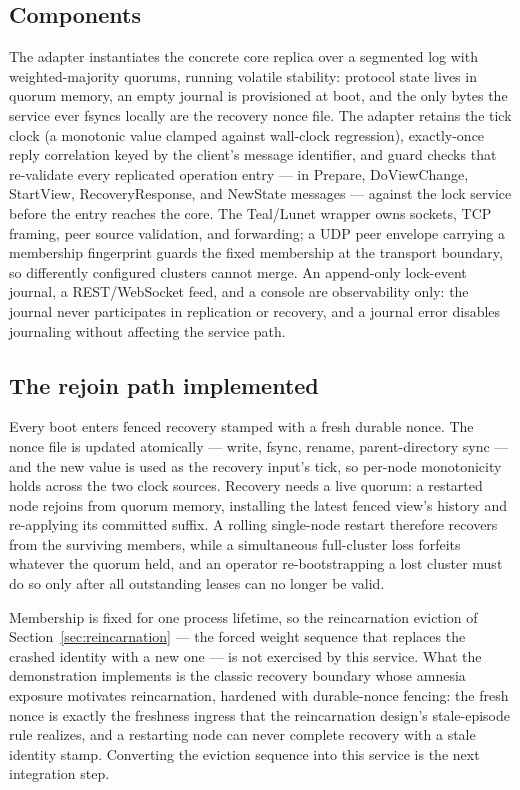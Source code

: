 \documentclass[10pt,journal,letterpaper]{IEEEtran}
\begin{document}
\subsection{Components}
The adapter instantiates the concrete core replica over a segmented log with
weighted-majority quorums, running volatile stability: protocol state lives
in quorum memory, an empty journal is provisioned at boot, and the only bytes
the service ever fsyncs locally are the recovery nonce file. The adapter
retains the tick clock (a monotonic value clamped against wall-clock
regression), exactly-once reply correlation keyed by the client's message
identifier, and guard checks that re-validate every replicated operation
entry --- in Prepare, DoViewChange, StartView, RecoveryResponse, and NewState
messages --- against the lock service before the entry reaches the core. The
Teal/Lunet wrapper owns sockets, TCP framing, peer source validation, and
forwarding; a UDP peer envelope carrying a membership fingerprint guards the
fixed membership at the transport boundary, so differently configured
clusters cannot merge. An append-only lock-event journal, a REST/WebSocket
feed, and a console are observability only: the journal never participates in
replication or recovery, and a journal error disables journaling without
affecting the service path.

\subsection{The rejoin path implemented}
Every boot enters fenced recovery stamped with a fresh durable nonce. The
nonce file is updated atomically --- write, fsync, rename, parent-directory
sync --- and the new value is used as the recovery input's tick, so
per-node monotonicity holds across the two clock sources. Recovery needs a
live quorum: a restarted node rejoins from quorum memory, installing the
latest fenced view's history and re-applying its committed suffix. A rolling
single-node restart therefore recovers from the surviving members, while a
simultaneous full-cluster loss forfeits whatever the quorum held, and an
operator re-bootstrapping a lost cluster must do so only after all
outstanding leases can no longer be valid.

Membership is fixed for one process lifetime, so the reincarnation eviction
of Section~\ref{sec:reincarnation} --- the forced weight sequence that
replaces the crashed identity with a new one --- is not exercised by this
service. What the demonstration implements is the classic recovery boundary
whose amnesia exposure motivates reincarnation, hardened with durable-nonce
fencing: the fresh nonce is exactly the freshness ingress that the
reincarnation design's stale-episode rule realizes, and a restarting node can
never complete recovery with a stale identity stamp. Converting the eviction
sequence into this service is the next integration step.
\end{document}
